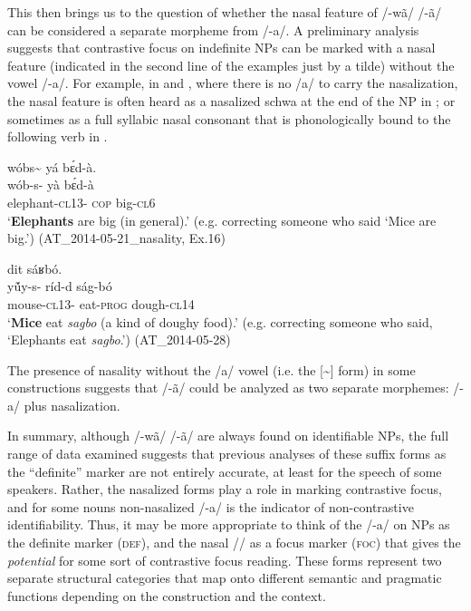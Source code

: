 \documentclass[output=paper]{langsci/langscibook}
\begin{document}
This then brings us to the question of whether the nasal feature of /-wã/ {\Tilde} /-ã/ can be considered a separate morpheme from /-a/. A preliminary analysis suggests that contrastive focus on indefinite NPs can be marked with a nasal feature (indicated in the second line of the examples just by a tilde) without the vowel /-a/. For example, in  and , where there is no /a/ to carry the nasalization, the nasal feature is often heard as a nasalized schwa at the end of the NP in ; or sometimes as a full syllabic nasal consonant that is phonologically bound to the following verb in .
 
\ea\label{ex:teo:55}
\glll w\'{o}bs\~{\textschwa} yá b\'ɛd-à.\\
wób-s-\textsuperscript{{\Tilde}}  yà b\'ɛd-à\\
elephant-\textsc{cl13}-\textsuperscript{{\Tilde}}  \textsc{cop} big-\textsc{cl6}\\
\glt ‘\textbf{Elephants} are big (in general).’ (e.g. correcting someone who said ‘Mice are big.’) (AT\_2014-05-21\_nasality, Ex.16)
\z
 
\ea\label{ex:teo:56}
 dit sáʁbó.\\
y\'ũy-s-\textsuperscript{{\Tilde}}  ríd-d{\rmfnm} ság-bó\\
mouse-\textsc{cl}13-\textsuperscript{{\Tilde}} eat-\textsc{prog} dough-\textsc{cl14} \\
\glt ‘\textbf{Mice} eat \textit{sagbo} (a kind of doughy food).’ (e.g. correcting someone who said, ‘Elephants eat \textit{sagbo}.’) (AT\_2014-05-28)
\z
{}

The presence of nasality without the /a/ vowel (i.e. the [\~{\schwa}] form) in some constructions suggests that /-ã/ could be analyzed as two separate morphemes: /-a/ plus nasalization.


In summary, although /-wã/ {\Tilde} /-ã/ are always found on identifiable NPs, the full range of data examined suggests that previous analyses of these suffix forms as the “definite” marker are not entirely accurate, at least for the speech of some  speakers. Rather, the nasalized forms play a role in marking contrastive focus, and for some nouns non-nasalized /-a/ is the indicator of non-contrastive identifiability. Thus, it may be more appropriate to think of the /-a/ on NPs as the definite marker (\textsc{def}), and the nasal /\textsuperscript{\Tilde}/ as a focus marker (\textsc{foc}) that gives the \textit{potential} for some sort of contrastive focus reading. These forms represent two separate structural categories that map onto different semantic and pragmatic functions depending on the construction and the context.
\end{document}
